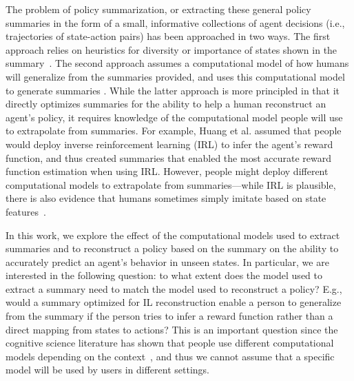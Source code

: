 \documentclass{article}
\begin{document}
The problem of policy summarization, or extracting these general policy summaries in the form of a small, informative collections of agent decisions (i.e., trajectories of state-action pairs) has been approached in two ways. 
The first approach relies on heuristics for diversity or importance of states shown in the summary~\cite{amir2018highlights,huang2018establishing}. The second approach assumes a computational model of how humans will generalize from the summaries provided, and uses this computational model to generate summaries \cite{huang17communicate}. While the latter approach is more principled in that it directly optimizes summaries for the ability to help a human reconstruct an agent's policy, it requires knowledge of the computational model people will use to extrapolate from summaries. For example, Huang et al. assumed that people would deploy inverse reinforcement learning (IRL) to infer the agent's reward function, and thus created summaries that enabled the most accurate reward function estimation when using IRL. However, people might deploy different computational models to extrapolate from summaries---while IRL is plausible, there is also evidence that humans sometimes simply imitate based on state features~\cite{gershman2017reinforcement}.

In this work, we explore the effect of the computational models used to extract summaries and to reconstruct a policy based on the summary on the ability to accurately predict an agent's behavior in unseen states. In particular, we are interested in the following question: to what extent does the model used to extract a summary need to match the model used to reconstruct a policy? E.g., would a summary optimized for IL reconstruction enable a person to generalize from the summary if the person tries to infer a reward function rather than a direct mapping from states to actions?  This is an important question since the cognitive science literature has shown that people use different computational models depending on the context~\cite{gershman2017reinforcement}, and thus we cannot assume that a specific model will be used by users in different settings.

\end{document}
